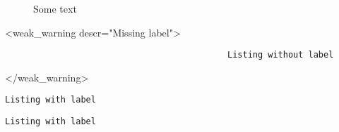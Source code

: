 \documentclass{article}
\begin{document}
    \begin{figure}
        \caption{Some text \label{fig:figure-caption-label}}
    \end{figure}

    <weak_warning descr="Missing label">\begin{lstlisting}
                                            Listing without label
    \end{lstlisting}</weak_warning>

    \begin{lstlisting}[label={lst:listing-label}, caption={Some caption}]
        Listing with label
    \end{lstlisting}

    \begin{lstlisting}[label=labelwithoutgroup]
        Listing with label
    \end{lstlisting}
\end{document}

